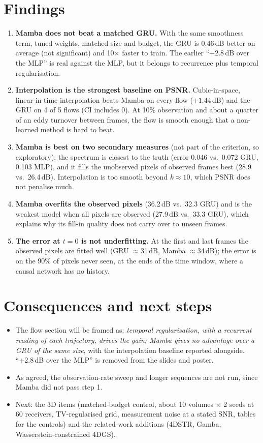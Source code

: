\documentclass[11pt,a4paper]{article}
\begin{document}
\section{Findings}
\begin{enumerate}
\item \textbf{Mamba does not beat a matched GRU.} With the same smoothness term, tuned weights, matched size and
budget, the GRU is 0.46\,dB better on average (not significant) and 10$\times$ faster to train. The earlier
``+2.8\,dB over the MLP'' is real against the MLP, but it belongs to recurrence plus temporal regularisation.
\item \textbf{Interpolation is the strongest baseline on PSNR.} Cubic-in-space, linear-in-time interpolation beats
Mamba on every flow ($+1.44$\,dB) and the GRU on 4 of 5 flows (CI includes 0). At 10\% observation and about a quarter
of an eddy turnover between frames, the flow is smooth enough that a non-learned method is hard to beat.
\item \textbf{Mamba is best on two secondary measures} (not part of the criterion, so exploratory): the spectrum is
closest to the truth (error 0.046 vs.\ 0.072 GRU, 0.103 MLP), and it fills the unobserved pixels of observed frames
best (28.9 vs.\ 26.4\,dB). Interpolation is too smooth beyond $k\approx10$, which PSNR does not penalise much.
\item \textbf{Mamba overfits the observed pixels} (36.2\,dB vs.\ 32.3 GRU) and is the weakest model when all pixels are
observed (27.9\,dB vs.\ 33.3 GRU), which explains why its fill-in quality does not carry over to unseen frames.
\item \textbf{The error at $t=0$ is not underfitting.} At the first and last frames the observed pixels are fitted
well (GRU $\approx$31\,dB, Mamba $\approx$34\,dB); the error is on the 90\% of pixels never seen, at the ends of the
time window, where a causal network has no history.
\end{enumerate}

\section{Consequences and next steps}
\begin{itemize}
\item The flow section will be framed as: \emph{temporal regularisation, with a recurrent reading of each trajectory,
drives the gain; Mamba gives no advantage over a GRU of the same size}, with the interpolation baseline reported
alongside. ``+2.8\,dB over the MLP'' is removed from the slides and poster.
\item As agreed, the observation-rate sweep and longer sequences are not run, since Mamba did not pass step 1.
\item Next: the 3D items (matched-budget control, about 10 volumes $\times$ 2 seeds at 60 receivers, TV-regularised
grid, measurement noise at a stated SNR, tables for the controls) and the related-work additions (4DSTR, Gamba,
Wasserstein-constrained 4DGS).
\end{itemize}
\end{document}
